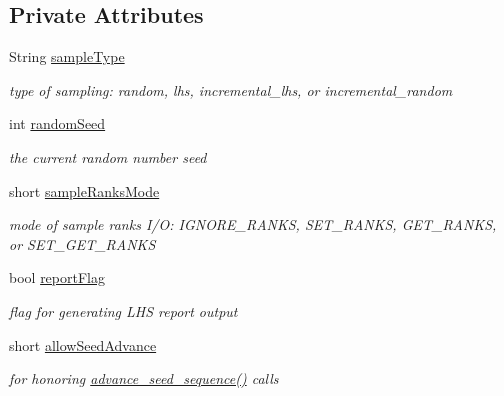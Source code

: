 \subsection*{Private Attributes}
\begin{DoxyCompactItemize}
\item 
String \hyperlink{classPecos_1_1LHSDriver_abf698fee418ab29591da10a6446c0c18}{sample\+Type}\label{classPecos_1_1LHSDriver_abf698fee418ab29591da10a6446c0c18}

\begin{DoxyCompactList}\small\item\em type of sampling\+: random, lhs, incremental\+\_\+lhs, or incremental\+\_\+random \end{DoxyCompactList}\item 
int \hyperlink{classPecos_1_1LHSDriver_a81ab89411a148610c9749af8e95cd453}{random\+Seed}\label{classPecos_1_1LHSDriver_a81ab89411a148610c9749af8e95cd453}

\begin{DoxyCompactList}\small\item\em the current random number seed \end{DoxyCompactList}\item 
short \hyperlink{classPecos_1_1LHSDriver_ac44aac00b4d7c697a8e5d8f32acccaf2}{sample\+Ranks\+Mode}\label{classPecos_1_1LHSDriver_ac44aac00b4d7c697a8e5d8f32acccaf2}

\begin{DoxyCompactList}\small\item\em mode of sample ranks I/O\+: I\+G\+N\+O\+R\+E\+\_\+\+R\+A\+N\+KS, S\+E\+T\+\_\+\+R\+A\+N\+KS, G\+E\+T\+\_\+\+R\+A\+N\+KS, or S\+E\+T\+\_\+\+G\+E\+T\+\_\+\+R\+A\+N\+KS \end{DoxyCompactList}\item 
bool \hyperlink{classPecos_1_1LHSDriver_a6659689711fd1c7d227a7c8a4e093d12}{report\+Flag}\label{classPecos_1_1LHSDriver_a6659689711fd1c7d227a7c8a4e093d12}

\begin{DoxyCompactList}\small\item\em flag for generating L\+HS report output \end{DoxyCompactList}\item 
short \hyperlink{classPecos_1_1LHSDriver_abc4c4d1b5324bce157150cda69831718}{allow\+Seed\+Advance}\label{classPecos_1_1LHSDriver_abc4c4d1b5324bce157150cda69831718}

\begin{DoxyCompactList}\small\item\em for honoring \hyperlink{classPecos_1_1LHSDriver_a968dc84c7b328c0fde5435adfbcd4ae4}{advance\+\_\+seed\+\_\+sequence()} calls \end{DoxyCompactList}\end{DoxyCompactItemize}


